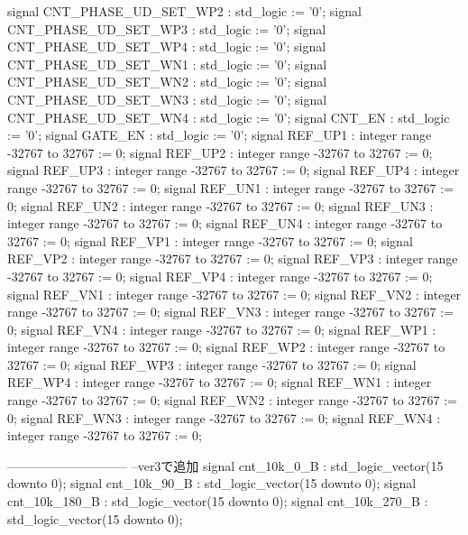 \begin{mylisting}[language=VHDL,caption=ゲート信号出力モジュール,label=MMC_PWM_GEN_module_VHDL]
	signal CNT_PHASE_UD_SET_WP2	: std_logic							:= '0';
	signal CNT_PHASE_UD_SET_WP3	: std_logic							:= '0';
	signal CNT_PHASE_UD_SET_WP4	: std_logic							:= '0';
	signal CNT_PHASE_UD_SET_WN1	: std_logic							:= '0';
	signal CNT_PHASE_UD_SET_WN2	: std_logic							:= '0';
	signal CNT_PHASE_UD_SET_WN3	: std_logic							:= '0';
	signal CNT_PHASE_UD_SET_WN4	: std_logic							:= '0';
	signal CNT_EN				: std_logic							:= '0';
	signal GATE_EN				: std_logic							:= '0';
	signal REF_UP1				: integer range -32767 to 32767		:= 0;
	signal REF_UP2				: integer range -32767 to 32767		:= 0;
	signal REF_UP3				: integer range -32767 to 32767		:= 0;
	signal REF_UP4				: integer range -32767 to 32767		:= 0;
	signal REF_UN1				: integer range -32767 to 32767		:= 0;
	signal REF_UN2				: integer range -32767 to 32767		:= 0;
	signal REF_UN3				: integer range -32767 to 32767		:= 0;
	signal REF_UN4				: integer range -32767 to 32767		:= 0;
	signal REF_VP1				: integer range -32767 to 32767		:= 0;
	signal REF_VP2				: integer range -32767 to 32767		:= 0;
	signal REF_VP3				: integer range -32767 to 32767		:= 0;
	signal REF_VP4				: integer range -32767 to 32767		:= 0;
	signal REF_VN1				: integer range -32767 to 32767		:= 0;
	signal REF_VN2				: integer range -32767 to 32767		:= 0;
	signal REF_VN3				: integer range -32767 to 32767		:= 0;
	signal REF_VN4				: integer range -32767 to 32767		:= 0;
	signal REF_WP1				: integer range -32767 to 32767		:= 0;
	signal REF_WP2				: integer range -32767 to 32767		:= 0;
	signal REF_WP3				: integer range -32767 to 32767		:= 0;
	signal REF_WP4				: integer range -32767 to 32767		:= 0;
	signal REF_WN1				: integer range -32767 to 32767		:= 0;
	signal REF_WN2				: integer range -32767 to 32767		:= 0;
	signal REF_WN3				: integer range -32767 to 32767		:= 0;
	signal REF_WN4				: integer range -32767 to 32767		:= 0;
	

	-----------------------------
	--ver3で追加
	signal	cnt_10k_0_B : std_logic_vector(15 downto 0);
	signal	cnt_10k_90_B : std_logic_vector(15 downto 0);
	signal	cnt_10k_180_B : std_logic_vector(15 downto 0);
	signal	cnt_10k_270_B : std_logic_vector(15 downto 0);
	

\end{mylisting}
